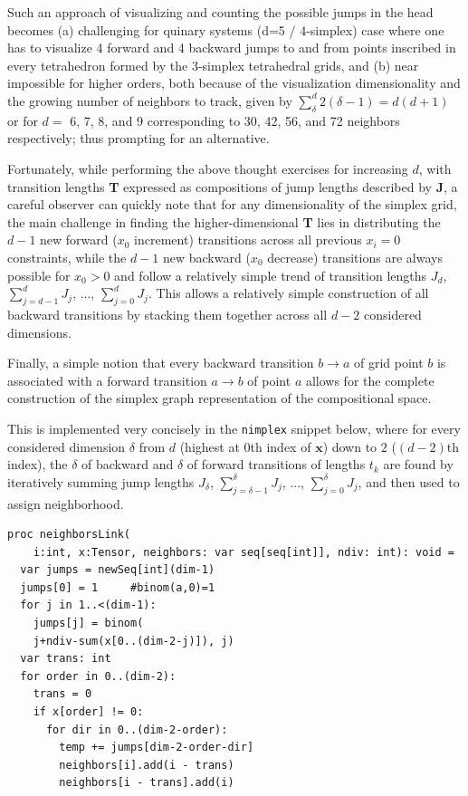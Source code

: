 Such an approach of visualizing and counting the possible jumps in the head becomes (a) challenging for quinary systems (d=5 / 4-simplex) case where one has to visualize 4 forward and 4 backward jumps to and from points inscribed in every tetrahedron formed by the 3-simplex tetrahedral grids, and (b) near impossible for higher orders, both because of the visualization dimensionality and the growing number of neighbors to track, given by $\sum_\delta^d 2(\delta-1)= d(d+1)$ or for $d=$ 6, 7, 8, and 9 corresponding to 30, 42, 56, and 72 neighbors respectively; thus prompting for an alternative.

Fortunately, while performing the above thought exercises for increasing $d$, with transition lengths \textbf{T} expressed as compositions of jump lengths described by \textbf{J}, a careful observer can quickly note that for any dimensionality of the simplex grid, the main challenge in finding the higher-dimensional \textbf{T} lies in distributing the $d-1$ new forward ($x_0$ increment) transitions across all previous $x_i=0$ constraints, while the $d-1$ new backward ($x_0$ decrease) transitions are always possible for $x_0>0$ and follow a relatively simple trend of transition lengths $J_d$, $\sum_{j=d-1}^{d}J_j$, ..., $\sum_{j=0}^{d}J_j$. This allows a relatively simple construction of all backward transitions by stacking them together across all $d-2$ considered dimensions. 

Finally, a simple notion that every backward transition $b \rightarrow a$ of grid point $b$ is associated with a forward transition $a \rightarrow b$ of point $a$ allows for the complete construction of the simplex graph representation of the compositional space.

This is implemented very concisely in the \texttt{nimplex} snippet below, where for every considered dimension $\delta$ from $d$ (highest at $0$th index of $\textbf{x}$) down to $2$ ($(d-2)$th index), the $\delta$ of backward and $\delta$ of forward transitions of lengths $t_k$ are found by iteratively summing jump lengths $J_{\delta}$, $\sum_{j=\delta-1}^{\delta}J_j$, ..., $\sum_{j=0}^{\delta}J_j$, and then used to assign neighborhood.

\begin{verbatim}
proc neighborsLink(
    i:int, x:Tensor, neighbors: var seq[seq[int]], ndiv: int): void =
  var jumps = newSeq[int](dim-1)
  jumps[0] = 1     #binom(a,0)=1
  for j in 1..<(dim-1):
    jumps[j] = binom(
    j+ndiv-sum(x[0..(dim-2-j)]), j)
  var trans: int
  for order in 0..(dim-2): 
    trans = 0
    if x[order] != 0:
      for dir in 0..(dim-2-order): 
        temp += jumps[dim-2-order-dir]
        neighbors[i].add(i - trans)
        neighbors[i - trans].add(i)           
\end{verbatim}

